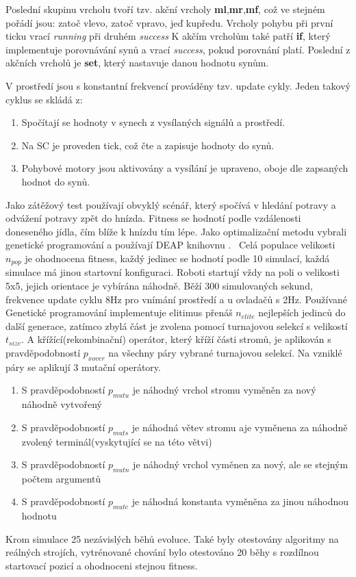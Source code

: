 Poslední skupinu vrcholu tvoří tzv. akční vrcholy \textbf{ml},\textbf{mr},\textbf{mf}, což ve stejném pořádí jsou: zatoč vlevo, zatoč vpravo, jeď kupředu. Vrcholy pohybu při první ticku vrací \textit{running} při druhém \textit{success} K akčím vrcholům také patří \textbf{if}, který implementuje porovnávání synů a vrací \textit{success}, pokud porovnání platí. Poslední z akčních vrcholů je \textbf{set}, který nastavuje danou hodnotu synům. 
\par
V prostředí jsou s konstantní frekvencí prováděny tzv. update cykly. Jeden takový cyklus se skládá z: 
\par
\begin{enumerate}
    \item Spočítají se hodnoty v synech z vysílaných signálů a prostředí. 
    \item Na SC je proveden tick, což čte a zapisuje hodnoty do synů. 
    \item Pohybové motory jsou aktivovány a vysílání je upraveno, oboje dle zapsaných hodnot do synů.
\end{enumerate}
\par 
Jako zátěžový test používají obvyklý scénář, který spočívá v hledání potravy a odvážení potravy zpět do hnízda. Fitness se hodnotí podle vzdálenosti doneseného jídla, čím blíže k hnízdu tím lépe. Jako optimalizační metodu vybrali genetické programování a používají DEAP knihovnu \cite{deap}. \
Celá populace velikosti $n_{pop}$ je ohodnocena fitness, každý jedinec se hodnotí podle 10 simulací, každá simulace má jinou startovní konfiguraci. Roboti startují vždy na poli o velikosti 5x5, jejich orientace je vybírána náhodně. Běží 300 simulovaných sekund, frekvence update cyklu 8Hz pro vnímání prostředí a u ovladačů s 2Hz. Používané Genetické programování implementuje elitimus přenáš $n_{elite}$ nejlepších jedinců do další generace, zatímco zbylá část je zvolena pomocí turnajovou selekcí s velikostí $t_{size}$. A křížící(rekombinační) operátor, který kříží části stromů, je aplikován s pravděpodobností $p_{xover}$ na všechny páry vybrané turnajovou selekcí. Na vzniklé páry se aplikují 3 mutační operátory. \par
\begin{enumerate}
    \item S pravděpodobností $p_{mutu}$ je náhodný vrchol stromu vyměněn za nový náhodně vytvořený 
    \item S pravděpodobností $p_{muts}$ je náhodná větev stromu aje  vyměnena za náhodně zvolený terminál(vyskytující se na této větvi)
    \item S pravděpodobností $p_{mutn}$ je náhodný vrchol vyměnen za nový, ale se stejným počtem argumentů
    \item S pravděpodobností $p_{mute}$ je náhodná konstanta vyměněna za jinou náhodnou hodnotu
\end{enumerate}
Krom simulace 25 nezávislých běhů evoluce. Také byly otestovány algoritmy na reálných strojích, vytrénované chování bylo otestováno 20 běhy s rozdílnou startovací pozicí a ohodnoceni stejnou fitness. 
\par 

